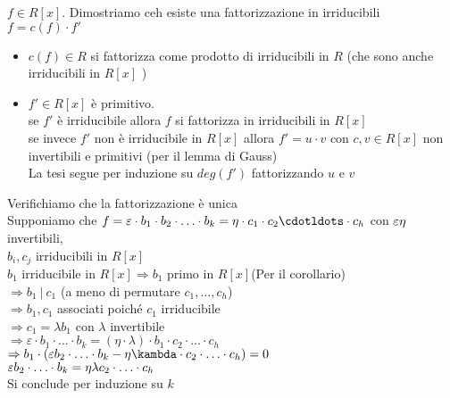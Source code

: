 \documentclass[12px]{article}
\begin{document}
\begin{dimo}
	$f\in R[x]$. Dimostriamo ceh esiste una fattorizzazione in irriducibili\\
	 $f = c(f)\cdot f'$
	 \begin{itemize}
	 	\item $c(f)\in R$ si fattorizza come prodotto di irriducibili in  $R$ (che sono anche irriducibili in  $R[x]$ )
		\item $f'\in R[x]$ è primitivo.\\
			se  $f'$ è irriducibile allora  $f$ si fattorizza in irriducibili in $R[x]$\\
			se invece $f'$   non è irriducibile in $R[x]$ allora  $f' = u\cdot v $ con $c,v\in R[x]$ non invertibili e primitivi (per il lemma di  Gauss)\\
			La tesi segue per induzione su $deg(f')$ fattorizzando  $u$ e  $v$
	 \end{itemize}
	 Verifichiamo che la fattorizzazione è unica\\
	 Supponiamo che $f = \varepsilon \cdot b_1\cdot b_2\cdot\ldots\cdot b_k = \eta\cdot c_1\cdot c_2\cdotldots \cdot c_h$ con $ \varepsilon \eta $ invertibili,\\ $b_i,c_j$ irriducibili in  $R[x]$\\
	 $b_1 $ irriducibile in $R[x] \Rightarrow  b_1$ primo in $R[x]$\hfill (Per il corollario)\\
	  $ \Rightarrow b_1 \ | \ c_1$ \hfill (a meno di permutare $c_1,\ldots,c_h$)\\
	  $ \Rightarrow b_1,c_1$ associati poiché $c_1$ irriducibile\\
	  $ \Rightarrow  c_1 = \lambda b_1$ con $\lambda$ invertibile\\
	   $ \Rightarrow \varepsilon \cdot b_1\cdot\ldots\cdot b_k = (\eta\cdot\lambda)\cdot b_1\cdot c_2\cdot\ldots\cdot c_h$\\
	   $ \Rightarrow b_1\cdot (\varepsilon b_2\cdot \ldots\cdot b_k - \eta\kambda\cdot c_2 \cdot\ldots\cdot c_h) = 0$ \\
	   $\varepsilon b_2\cdot\ldots\cdot b_k = \eta\lambda c_2\cdot\ldots \cdot c_h$\\
	   Si conclude per induzione su $k$

\end{dimo}
\end{document}
